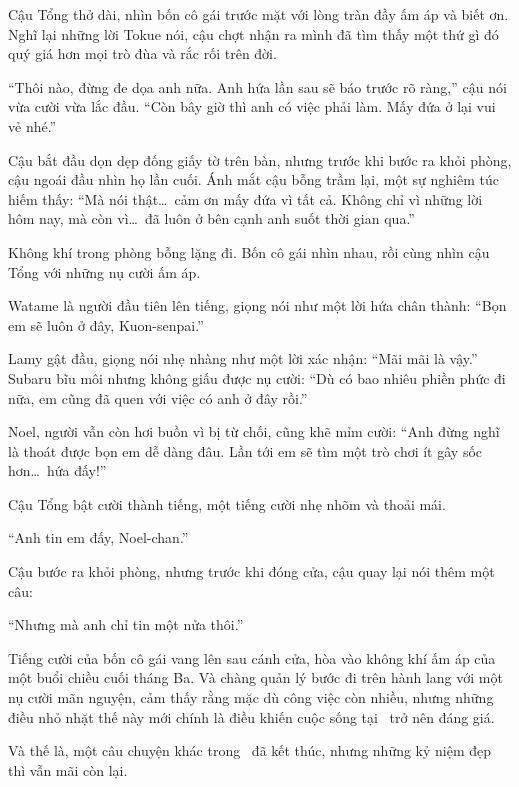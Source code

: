 \documentclass[../main.tex]{subfiles}
\begin{document}
Cậu Tổng thở dài, nhìn bốn cô gái trước mặt với lòng tràn đầy ấm áp và biết ơn. Nghĩ lại những lời Tokue nói, cậu chợt nhận ra mình đã tìm thấy một thứ gì đó quý giá hơn mọi trò đùa và rắc rối trên đời.

``Thôi nào, đừng đe dọa anh nữa. Anh hứa lần sau sẽ báo trước rõ ràng,'' cậu nói vừa cười vừa lắc đầu. ``Còn bây giờ thì anh có việc phải làm. Mấy đứa ở lại vui vẻ nhé.''

Cậu bắt đầu dọn dẹp đống giấy tờ trên bàn, nhưng trước khi bước ra khỏi phòng, cậu ngoái đầu nhìn họ lần cuối. Ánh mắt cậu bỗng trầm lại, một sự nghiêm túc hiếm thấy: ``Mà nói thật\dots\ cảm ơn mấy đứa vì tất cả. Không chỉ vì những lời hôm nay, mà còn vì\dots\ đã luôn ở bên cạnh anh suốt thời gian qua.''

Không khí trong phòng bỗng lặng đi. Bốn cô gái nhìn nhau, rồi cùng nhìn cậu Tổng với những nụ cười ấm áp.

Watame là người đầu tiên lên tiếng, giọng nói như một lời hứa chân thành: ``Bọn em sẽ luôn ở đây, Kuon-senpai.''

Lamy gật đầu, giọng nói nhẹ nhàng như một lời xác nhận: ``Mãi mãi là vậy.'' Subaru bĩu môi nhưng không giấu được nụ cười: ``Dù có bao nhiêu phiền phức đi nữa, em cũng đã quen với việc có anh ở đây rồi.''

Noel, người vẫn còn hơi buồn vì bị từ chối, cũng khẽ mỉm cười: ``Anh đừng nghĩ là thoát được bọn em dễ dàng đâu. Lần tới em sẽ tìm một trò chơi ít gây sốc hơn\dots\ hứa đấy!''

Cậu Tổng bật cười thành tiếng, một tiếng cười nhẹ nhõm và thoải mái.

``Anh tin em đấy, Noel-chan.''

Cậu bước ra khỏi phòng, nhưng trước khi đóng cửa, cậu quay lại nói thêm một câu:

``Nhưng mà anh chỉ tin một nửa thôi.''

Tiếng cười của bốn cô gái vang lên sau cánh cửa, hòa vào không khí ấm áp của một buổi chiều cuối tháng Ba. Và chàng quản lý bước đi trên hành lang với một nụ cười mãn nguyện, cảm thấy rằng mặc dù công việc còn nhiều, nhưng những điều nhỏ nhặt thế này mới chính là điều khiến cuộc sống tại \hll\ trở nên đáng giá.

Và thế là, một câu chuyện khác trong \hll\ đã kết thúc, nhưng những kỷ niệm đẹp thì vẫn mãi còn lại.
\end{document}
